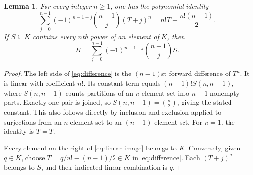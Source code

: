 \documentclass[11pt,a4paper]{article}
\newtheorem{lemma}[theorem]{Lemma}
\theoremstyle{definition}
\begin{document}
\begin{lemma}\label{lem:finite-difference}
For every integer $n\ge1$, one has the polynomial identity
\begin{equation}\label{eq:difference}
 \sum_{j=0}^{n-1}(-1)^{n-1-j}\binom{n-1}{j}(T+j)^n
                    =n!T+\frac{n!(n-1)}2.
\end{equation}
If $S\subseteq K$ contains every $n$th power of an element of $K$,
then
\begin{equation}\label{eq:linear-image}
       K=\sum_{j=0}^{n-1}
                   (-1)^{n-1-j}\binom{n-1}{j}S.
\end{equation}
\end{lemma}
\begin{proof}
The left side of \eqref{eq:difference} is the $(n-1)$st forward
difference of $T^n$. It is linear with coefficient $n!$.
Its constant term equals $(n-1)!S(n,n-1)$, where $S(n,n-1)$
counts partitions of an $n$-element set into $n-1$ nonempty parts.
Exactly one pair is joined, so $S(n,n-1)=\binom n2$, giving the
stated constant. This also follows directly by inclusion and
exclusion applied to surjections from an $n$-element set to an
$(n-1)$-element set. For $n=1$, the identity is $T=T$.

Every element on the right of \eqref{eq:linear-image} belongs to
$K$. Conversely, given $q\in K$, choose
$T=q/n!-(n-1)/2\in K$ in \eqref{eq:difference}. Each $(T+j)^n$
belongs to $S$, and their indicated linear combination is $q$.
\end{proof}
\end{document}
